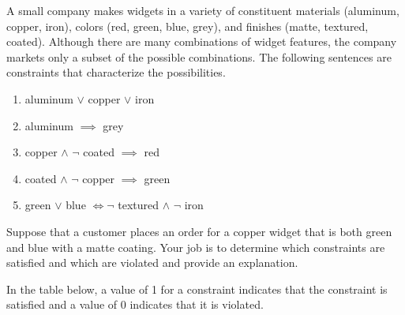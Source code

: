 \documentclass[addpoints]{exam}
\begin{document}
\begin{questions}

\question[5] A small company makes widgets in a variety of constituent materials (aluminum, copper, iron), colors (red, green, blue, grey), and finishes (matte, textured, coated). Although there are many combinations of widget features, the company markets only a subset of the possible combinations. The following sentences are constraints that characterize the possibilities. 
  \begin{enumerate}
  \item aluminum $\lor$ copper $\lor$ iron
  \item aluminum $\implies$ grey
  \item copper $\land$ $\neg$ coated $\implies$ red
  \item coated $\land$ $\neg$ copper $\implies$ green
  \item green $\lor$ blue $\iff \neg$ textured $\land$ $\neg$ iron
  \end{enumerate}
  Suppose that a customer places an order for a copper widget that is both green and blue with a matte coating. Your job is to determine which constraints are satisfied and which are violated and provide an explanation.
  \begin{solution} %
    In the table below, a value of 1 for a constraint indicates that the constraint is satisfied and a value of 0 indicates that it is violated.


\end{solution}
\end{questions}
\end{document}
